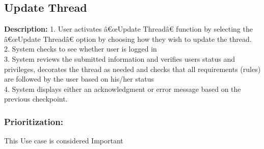 \documentclass[a4paper,11pt]{article}
\begin{document}
\subsection{Update Thread}
\textbf{Description:}
1.	User activates â€œUpdate Threadâ€ function by selecting the â€œUpdate Threadâ€ option by choosing how they wish to update the thread.\\
2.	System checks to see whether user is logged in\\
3.	System reviews the submitted information and  verifies users status and privileges, decorates the thread as needed and checks that all requirements (rules) are followed by the user based on his/her status\\
4.	 System displays either an acknowledgment or error message based on the previous checkpoint.\\

\subsubsection{Prioritization:} 
This Use case is considered Important\\
\end{document}
